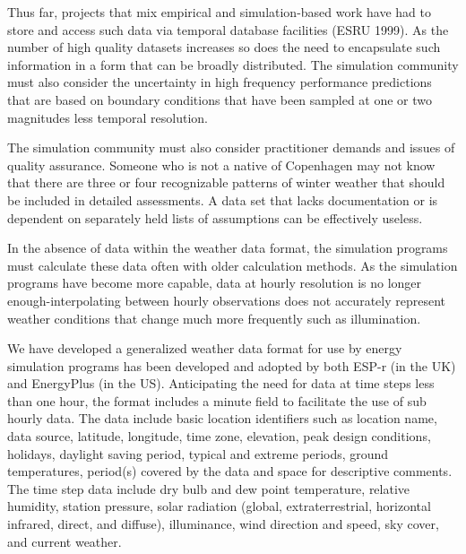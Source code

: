 Thus far, projects that mix empirical and simulation-based work have had to store and access such data via temporal database facilities (ESRU 1999). As the number of high quality datasets increases so does the need to encapsulate such information in a form that can be broadly distributed. The simulation community must also consider the uncertainty in high frequency performance predictions that are based on boundary conditions that have been sampled at one or two magnitudes less temporal resolution.

The simulation community must also consider practitioner demands and issues of quality assurance. Someone who is not a native of Copenhagen may not know that there are three or four recognizable patterns of winter weather that should be included in detailed assessments. A data set that lacks documentation or is dependent on separately held lists of assumptions can be effectively useless.

In the absence of data within the weather data format, the simulation programs must calculate these data often with older calculation methods. As the simulation programs have become more capable, data at hourly resolution is no longer enough-interpolating between hourly observations does not accurately represent weather conditions that change much more frequently such as illumination.

We have developed a generalized weather data format for use by energy simulation programs has been developed and adopted by both ESP-r (in the UK) and EnergyPlus (in the US). Anticipating the need for data at time steps less than one hour, the format includes a minute field to facilitate the use of sub hourly data. The data include basic location identifiers such as location name, data source, latitude, longitude, time zone, elevation, peak design conditions, holidays, daylight saving period, typical and extreme periods, ground temperatures, period(s) covered by the data and space for descriptive comments. The time step data include dry bulb and dew point temperature, relative humidity, station pressure, solar radiation (global, extraterrestrial, horizontal infrared, direct, and diffuse), illuminance, wind direction and speed, sky cover, and current weather.
